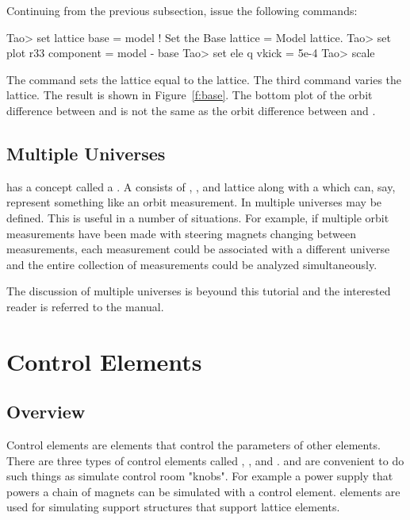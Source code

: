 \documentclass{hitec}
\newcommand{\Section}[1]{\section{#1}\vspace*{-1ex}}
\begin{document}
Continuing from the previous subsection, issue the following commands:
{\small
\begin{code}
Tao> set lattice base = model  ! Set the Base lattice = Model lattice.
Tao> set plot r33 component = model - base
Tao> set ele q vkick = 5e-4
Tao> scale
\end{code}} 
The  command sets the  lattice equal to the 
lattice. The third command varies the  lattice.  The result is shown in
Figure~\ref{f:base}. The bottom plot of the orbit difference between  and
 is not the same as the orbit difference between  and .

\subsection{Multiple Universes}

\tao has a concept called a . A  consists of , ,
and  lattice along with a  which can, say, represent something like
an orbit measurement. In \tao multiple universes may be defined. This is useful in a number of 
situations. For example, if multiple orbit measurements have been made with steering magnets
changing between measurements, each measurement could be associated with a different universe
and the entire collection of measurements could be analyzed simultaneously. 

The discussion of multiple universes is beyound this tutorial and the interested reader is 
referred to the \tao manual.


\Section{Control Elements}

\subsection{Overview}

Control elements are elements that control the parameters of other elements. There are three types
of control elements called , , and .  and
 are convenient to do such things as simulate control room "knobs". For example a power
supply that powers a chain of magnets can be simulated with a control element.
 elements are used for simulating support structures that support lattice elements.
\end{document}
